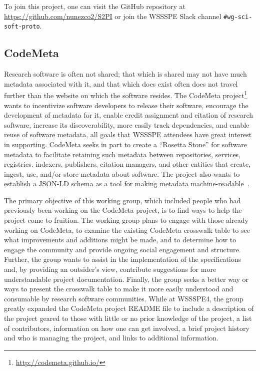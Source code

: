 \documentclass[11pt, oneside]{amsart}
\newcommand{\note}[1]{ {\textcolor{blueish}    { ***Note:      #1 }}}
\begin{document}
To join this project, one can visit the GitHub repository at
\url{https://github.com/nunezco2/S2PI} or join the WSSSPE Slack channel
\texttt{\#wg-sci-soft-proto}.


\subsection{CodeMeta}
\label{sec:CodeMeta}


Research software is often not shared; that which is shared may not have much metadata associated with it, and that which does exist often does not travel further than the website on which the software resides. The CodeMeta project\footnote{\url{http://codemeta.github.io/}} wants to incentivize software developers to release their software, encourage the development of metadata for it, enable credit assignment and citation of research software, increase its discoverability, more easily track dependencies, and enable reuse of software metadata, all goals that WSSSPE attendees have great interest in supporting.  CodeMeta seeks in part to create a ``Rosetta Stone'' for software metadata to facilitate retaining such metadata between repositories, services, registries, indexers, publishers, citation managers, and other entities that create, ingest, use, and/or store metadata about software. The project also wants to establish a JSON-LD schema as a tool for making metadata machine-readable~\cite{CodeMeta_schema}.

The primary objective of this working group, which included people who had previously been working on the CodeMeta project, is to find ways to help the project come to fruition.
%
The working group plans to engage with those already working on CodeMeta, to examine the existing CodeMeta crosswalk table to see what improvements and additions might be made, and to determine how to engage the community and provide ongoing social engagement and structure. Further, the group wants to assist in the implementation of the specifications and, by providing an outsider's view, contribute suggestions for more understandable project documentation. Finally, the group seeks a better way or ways to present the crosswalk table to make it more easily understood and consumable by research software communities.
%
While at WSSSPE4, the group greatly expanded the CodeMeta project README file to include a description of the project geared to those with little or no prior knowledge of the project, a list of contributors, information on how one can get involved, a brief project history and who is managing the project, and links to additional information.
\end{document}

